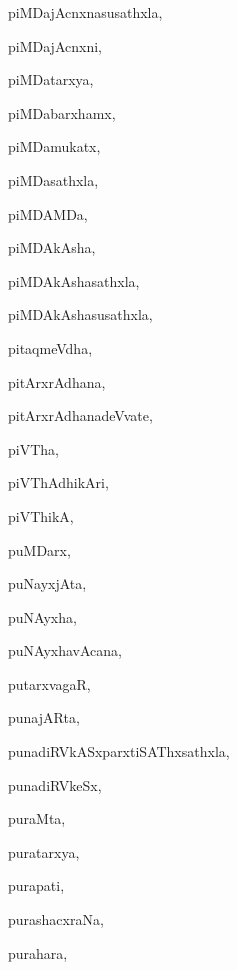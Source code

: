 \begin{multicols}{3}
{\noindent
{piMDajAcnxnasusathxla}, \pageref{piMDajAcnxnasusathxla}

\noindent
{piMDajAcnxni}, \pageref{piMDajAcnxni}

\noindent
{piMDatarxya}, \pageref{piMDatarxya}

\noindent
{piMDabarxhamx}, \pageref{piMDabarxhamx}

\noindent
{piMDamukatx}, \pageref{piMDamukatx}

\noindent
{piMDasathxla}, \pageref{piMDasathxla}

\noindent
{piMDAMDa}, \pageref{piMDAMDa}

\noindent
{piMDAkAsha}, \pageref{piMDAkAsha}

\noindent
{piMDAkAshasathxla}, \pageref{piMDAkAshasathxla}

\noindent
{piMDAkAshasusathxla}, \pageref{piMDAkAshasusathxla}

\noindent
{pitaqmeVdha}, \pageref{pitaqmeVdha}

\noindent
{pitArxrAdhana}, \pageref{pitArxrAdhana}

\noindent
{pitArxrAdhanadeVvate}, \pageref{pitArxrAdhanadeVvate}

\noindent
{piVTha}, \pageref{piVTha}

\noindent
{piVThAdhikAri}, \pageref{piVThAdhikAri}

\noindent
{piVThikA}, \pageref{piVThikA}

\noindent
{puMDarx}, \pageref{puMDarx}

\noindent
{puNayxjAta}, \pageref{puNayxjAta}

\noindent
{puNAyxha}, \pageref{puNAyxha}

\noindent
{puNAyxhavAcana}, \pageref{puNAyxhavAcana}

\noindent
{putarxvagaR}, \pageref{putarxvagaR}

\noindent
{punajARta}, \pageref{punajARta}

\noindent
{punadiRVkASxparxtiSAThxsathxla}, \pageref{punadiRVkASxparxtiSAThxsathxla}

\noindent
{punadiRVkeSx}, \pageref{punadiRVkeSx}

\noindent
{puraMta}, \pageref{puraMta}

\noindent
{puratarxya}, \pageref{puratarxya}

\noindent
{purapati}, \pageref{purapati}

\noindent
{purashacxraNa}, \pageref{purashacxraNa}

\noindent
{purahara}, \pageref{purahara}

}
\end{multicols}
